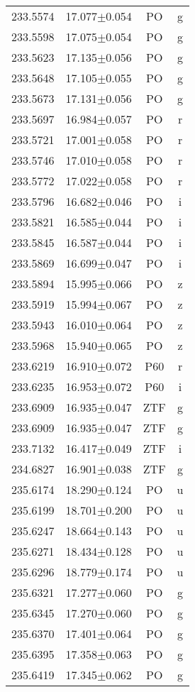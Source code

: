 \begin{table}
\begin{tabular}{cccc}
233.5574 & 17.077$\pm$0.054 & PO & g \\
233.5598 & 17.075$\pm$0.054 & PO & g \\
233.5623 & 17.135$\pm$0.056 & PO & g \\
233.5648 & 17.105$\pm$0.055 & PO & g \\
233.5673 & 17.131$\pm$0.056 & PO & g \\
233.5697 & 16.984$\pm$0.057 & PO & r \\
233.5721 & 17.001$\pm$0.058 & PO & r \\
233.5746 & 17.010$\pm$0.058 & PO & r \\
233.5772 & 17.022$\pm$0.058 & PO & r \\
233.5796 & 16.682$\pm$0.046 & PO & i \\
233.5821 & 16.585$\pm$0.044 & PO & i \\
233.5845 & 16.587$\pm$0.044 & PO & i \\
233.5869 & 16.699$\pm$0.047 & PO & i \\
233.5894 & 15.995$\pm$0.066 & PO & z \\
233.5919 & 15.994$\pm$0.067 & PO & z \\
233.5943 & 16.010$\pm$0.064 & PO & z \\
233.5968 & 15.940$\pm$0.065 & PO & z \\
233.6219 & 16.910$\pm$0.072 & P60 & r \\
233.6235 & 16.953$\pm$0.072 & P60 & i \\
233.6909 & 16.935$\pm$0.047 & ZTF & g \\
233.6909 & 16.935$\pm$0.047 & ZTF & g \\
233.7132 & 16.417$\pm$0.049 & ZTF & i \\
234.6827 & 16.901$\pm$0.038 & ZTF & g \\
235.6174 & 18.290$\pm$0.124 & PO & u \\
235.6199 & 18.701$\pm$0.200 & PO & u \\
235.6247 & 18.664$\pm$0.143 & PO & u \\
235.6271 & 18.434$\pm$0.128 & PO & u \\
235.6296 & 18.779$\pm$0.174 & PO & u \\
235.6321 & 17.277$\pm$0.060 & PO & g \\
235.6345 & 17.270$\pm$0.060 & PO & g \\
235.6370 & 17.401$\pm$0.064 & PO & g \\
235.6395 & 17.358$\pm$0.063 & PO & g \\
235.6419 & 17.345$\pm$0.062 & PO & g \\

\end{tabular}
\end{table}

